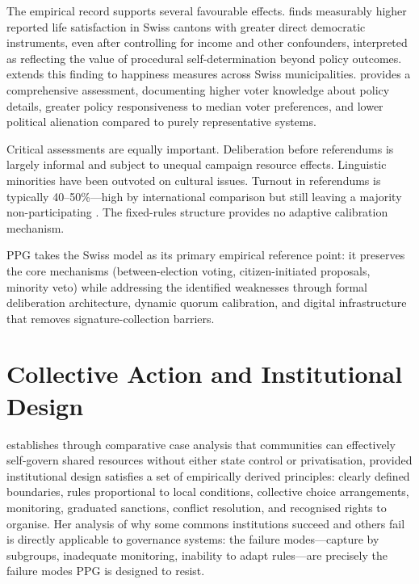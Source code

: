 \documentclass[12pt,a4paper,oneside]{report}
\begin{document}
The empirical record supports several favourable effects. \citet{frey1994direct} finds measurably higher reported life satisfaction in Swiss cantons with greater direct democratic instruments, even after controlling for income and other confounders, interpreted as reflecting the value of procedural self-determination beyond policy outcomes. \citet{stutzer2000happiness} extends this finding to happiness measures across Swiss municipalities. \citet{linder2010swiss} provides a comprehensive assessment, documenting higher voter knowledge about policy details, greater policy responsiveness to median voter preferences, and lower political alienation compared to purely representative systems.

Critical assessments are equally important. Deliberation before referendums is largely informal and subject to unequal campaign resource effects. Linguistic minorities have been outvoted on cultural issues. Turnout in referendums is typically 40--50\%---high by international comparison but still leaving a majority non-participating \citep{linder2010swiss}. The fixed-rules structure provides no adaptive calibration mechanism.

PPG takes the Swiss model as its primary empirical reference point: it preserves the core mechanisms (between-election voting, citizen-initiated proposals, minority veto) while addressing the identified weaknesses through formal deliberation architecture, dynamic quorum calibration, and digital infrastructure that removes signature-collection barriers.

\section{Collective Action and Institutional Design}

\citet{ostrom1990governing} establishes through comparative case analysis that communities can effectively self-govern shared resources without either state control or privatisation, provided institutional design satisfies a set of empirically derived principles: clearly defined boundaries, rules proportional to local conditions, collective choice arrangements, monitoring, graduated sanctions, conflict resolution, and recognised rights to organise. Her analysis of why some commons institutions succeed and others fail is directly applicable to governance systems: the failure modes---capture by subgroups, inadequate monitoring, inability to adapt rules---are precisely the failure modes PPG is designed to resist.
\end{document}
